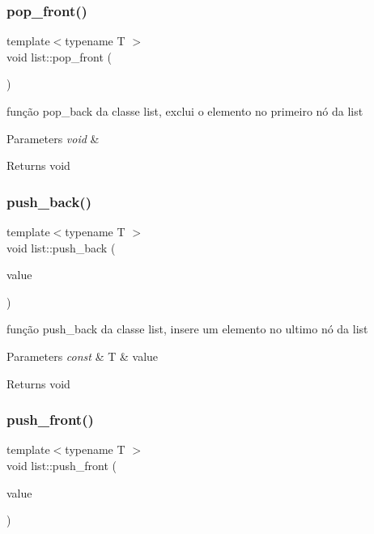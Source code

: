 \subsubsection{\texorpdfstring{pop\+\_\+front()}{pop\_front()}}
{\footnotesize\ttfamily template$<$typename T $>$ \\
void list\+::pop\+\_\+front (\begin{DoxyParamCaption}{ }\end{DoxyParamCaption})}

função pop\+\_\+back da classe list, exclui o elemento no primeiro nó da list 
\begin{DoxyParams}{Parameters}
{\em void} & \\
\hline
\end{DoxyParams}
\begin{DoxyReturn}{Returns}
void 
\end{DoxyReturn}
\mbox{\label{classsc_1_1list_a86207fd2b1a6355882e0f1c581b5bc65}} 
\subsubsection{\texorpdfstring{push\+\_\+back()}{push\_back()}}
{\footnotesize\ttfamily template$<$typename T $>$ \\
void list\+::push\+\_\+back (\begin{DoxyParamCaption}\item[{const T \&}]{value }\end{DoxyParamCaption})}

função push\+\_\+back da classe list, insere um elemento no ultimo nó da list 
\begin{DoxyParams}{Parameters}
{\em const} & T \& value \\
\hline
\end{DoxyParams}
\begin{DoxyReturn}{Returns}
void 
\end{DoxyReturn}
\mbox{\label{classsc_1_1list_aff098c381e8ad50e58c20c668d4d5d77}} 
\subsubsection{\texorpdfstring{push\+\_\+front()}{push\_front()}}
{\footnotesize\ttfamily template$<$typename T $>$ \\
void list\+::push\+\_\+front (\begin{DoxyParamCaption}\item[{const T \&}]{value }\end{DoxyParamCaption})}

